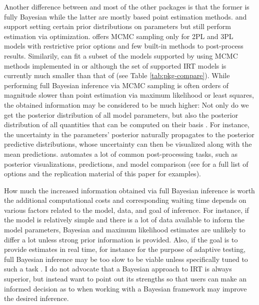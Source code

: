 \documentclass[jss]{jss}
\begin{document}
Another difference between  and most of the other packages is
that the former is fully Bayesian while the latter are mostly based
point estimation methods.  and  support setting
certain prior distributions on parameters but still perform estimation
via optimization.  offers MCMC sampling only for 2PL and 3PL
models with restrictive prior options and few built-in methods to
post-process results. Similarily,  can fit a subset of the
models supported by  using MCMC methods implemented in
 \citep{jags} or  \citep{carpenter2017}
although the set of supported IRT models is currently much smaller than
that of  (see Table \ref{tab:pkg-compare}). While performing
full Bayesian inference via MCMC sampling is often orders of magnitude
slower than point estimation via maximum likelihood or least squares,
the obtained information may be considered to be much higher: Not only
do we get the posterior distribution of all model parameters, but also
the posterior distribution of all quantities that can be computed on
their basis \citep{gelman2013}. For instance, the uncertainty in the
parameters' posterior naturally propagates to the posterior predictive
distributions, whose uncertainty can then be visualized along with the
mean predictions.  automates a lot of common post-processing
tasks, such as posterior visualizations, predictions, and model
comparison (see  for a full list of
options and the replication material of this paper for examples).

How much the increased information obtained via full Bayesian inference
is worth the additional computational costs and corresponding waiting
time depends on various factors related to the model, data, and goal of
inference. For instance, if the model is relatively simple and there is
a lot of data available to inform the model parameters, Bayesian and
maximum likelihood estimates are unlikely to differ a lot unless strong
prior information is provided. Also, if the goal is to provide estimates
in real time, for instance for the purpose of adaptive testing, full
Bayesian inference may be too slow to be viable unless specifically
tuned to such a task \citep[e.g., see][]{vanderlinen2015}. I do not
advocate that a Bayesian approach to IRT is always superior, but instead
want to point out its strengths so that users can make an informed
decision as to when working with a Bayesian framework may improve the
desired inference.
\end{document}

